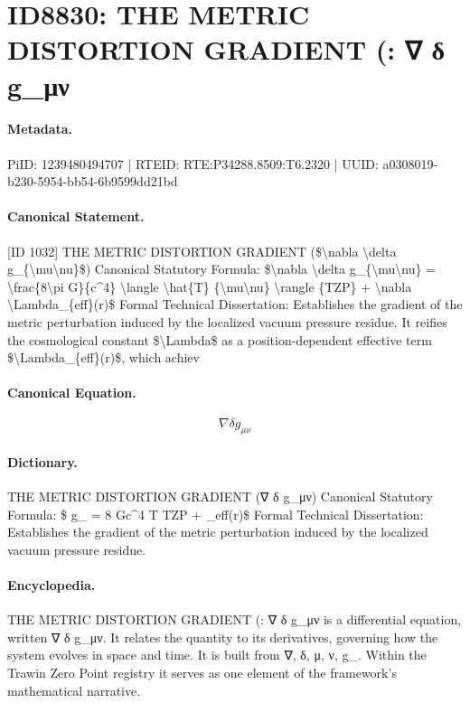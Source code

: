 \section*{ID8830: THE METRIC DISTORTION GRADIENT (: ∇ δ g\_μν}
\paragraph{Metadata.}
PiID: 1239480494707 | RTEID: RTE:P34288.8509:T6.2320 | UUID: a0308019-b230-5954-bb54-6b9599dd21bd

\paragraph{Canonical Statement.}
[ID 1032] THE METRIC DISTORTION GRADIENT (\$\textbackslash{}nabla \textbackslash{}delta g\_\{\textbackslash{}mu\textbackslash{}nu\}\$) Canonical Statutory Formula: \$\textbackslash{}nabla \textbackslash{}delta g\_\{\textbackslash{}mu\textbackslash{}nu\} = \textbackslash{}frac\{8\textbackslash{}pi G\}\{c\textasciicircum{}4\} \textbackslash{}langle \textbackslash{}hat\{T\} \{\textbackslash{}mu\textbackslash{}nu\} \textbackslash{}rangle \{TZP\} + \textbackslash{}nabla \textbackslash{}Lambda\_\{eff\}(r)\$ Formal Technical Dissertation: Establishes the gradient of the metric perturbation induced by the localized vacuum pressure residue. It reifies the cosmological constant \$\textbackslash{}Lambda\$ as a position-dependent effective term \$\textbackslash{}Lambda\_\{eff\}(r)\$, which achiev

\paragraph{Canonical Equation.}
\[
\nabla \delta g_{\mu\nu}
\]

\paragraph{Dictionary.}
THE METRIC DISTORTION GRADIENT (∇ δ g\_μν) Canonical Statutory Formula: \$ g\_ = 8 Gc\textasciicircum{}4 T TZP + \_eff(r)\$ Formal Technical Dissertation: Establishes the gradient of the metric perturbation induced by the localized vacuum pressure residue.

\paragraph{Encyclopedia.}
THE METRIC DISTORTION GRADIENT (: ∇ δ g\_μν is a differential equation, written ∇ δ g\_μν. It relates the quantity to its derivatives, governing how the system evolves in space and time. It is built from ∇, δ, μ, ν, g\_. Within the Trawin Zero Point registry it serves as one element of the framework's mathematical narrative.

